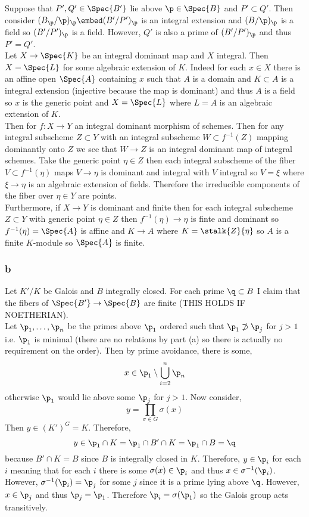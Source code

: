 \documentclass[12pt]{article}
\begin{document}
Suppose that $P',Q' \in \Spec{B'}$ lie above $\p \in \Spec{B}$ and $P' \subset Q'$. Then consider $(B_\p / \p)_\p \embed (B' / P')_\p$ is an integral extension and $(B / \p)_\p$ is a field so $(B' / P')_\p$ is a field. However, $Q'$ is also a prime of $(B' / P')_\p$ and thus $P' = Q'$.
\bigskip\\
Let $X \to \Spec{K}$ be an integral dominant map and $X$ integral. Then $X = \Spec{L}$ for some algebraic extension of $K$. Indeed for each $x \in X$ there is an affine open $\Spec{A}$ containing $x$ such that $A$ is a domain and $K \subset A$ is a integral extension (injective because the map is dominant) and thus $A$ is a field so $x$ is the generic point and $X = \Spec{L}$ where $L = A$ is an algebraic extension of $K$.
\bigskip\\
Then for $f : X \to Y$ an integral dominant morphism of schemes. Then for any integral subscheme $Z \subset Y$ with an integral subscheme $W \subset f^{-1}(Z)$ mapping dominantly onto $Z$ we see that $W \to Z$ is an integral dominant map of integral schemes. Take the generic point $\eta \in Z$ then each integral subscheme of the fiber $V \subset f^{-1}(\eta)$ maps $V \to \eta$ is dominant and integral with $V$ integral so $V = \xi$ where $\xi \to \eta$ is an algebraic extension of fields. Therefore the irreducible components of the fiber over $\eta \in Y$ are points.
\bigskip\\
Furthermore, if $X \to Y$ is dominant and finite then for each integral subscheme $Z \subset Y$ with generic point $\eta \in Z$ then $f^{-1}(\eta) \to \eta$ is finte and dominant so $f^{-1}(\eta) = \Spec{A}$ is affine and $K \to A$ where $K = \stalk{Z}{\eta}$ so $A$ is a finite $K$-module so $\Spec{A}$ is finite.

\subsubsection{b}

Let $K'/K$ be Galois and $B$ integrally closed. For each prime $\q \subset B$ I claim that the fibers of $\Spec{B'} \to \Spec{B}$ are finite (THIS HOLDS IF NOETHERIAN).
\bigskip\\
Let $\p_1, \dots, \p_n$ be the primes above $\p_1$ ordered such that $\p_1 \not\supset \p_j$ for $j > 1$ i.e. $\p_1$ is minimal (there are no relations by part (a) so there is actually no requirement on the order). Then by prime avoidance, there is some,
\[ x \in \p_1 \setminus \bigcup_{i = 2}^n \p_n \]
otherwise $\p_1$ would lie above some $\p_j$ for $j > 1$.
Now consider,
\[ y = \prod_{\sigma \in G} \sigma(x) \]
Then $y \in (K')^G = K$. Therefore,
\[ y \in \p_1 \cap K = \p_1 \cap B' \cap K = \p_1 \cap B = \q \]
because $B' \cap K = B$ since $B$ is integrally closed in $K$. Therefore, $y \in \p_i$ for each $i$ meaning that for each $i$ there is some $\sigma(x) \in \p_i$ and thus $x \in \sigma^{-1}(\p_i)$. However, $\sigma^{-1}(\p_i) = \p_j$ for some $j$ since it is a prime lying above $\q$. However, $x \in \p_j$ and thus $\p_j = \p_1$. Therefore $\p_i = \sigma(\p_1)$ so the Galois group acts transitively.
\end{document}
